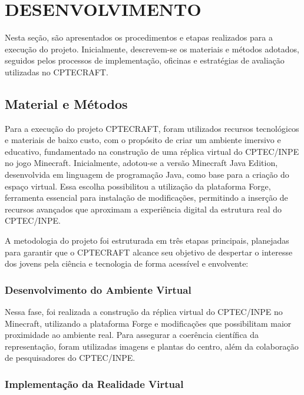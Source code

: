
\chapter{DESENVOLVIMENTO}

Nesta seção, são apresentados os procedimentos e etapas realizados para a execução do projeto. Inicialmente, descrevem-se os materiais e métodos adotados, seguidos pelos processos de implementação, oficinas e estratégias de avaliação utilizadas no CPTECRAFT.

\section{Material e Métodos}

Para a execução do projeto CPTECRAFT, foram utilizados recursos tecnológicos e materiais de baixo custo, com o propósito de criar um ambiente imersivo e educativo, fundamentado na construção de uma réplica virtual do CPTEC/INPE no jogo Minecraft. Inicialmente, adotou-se a versão Minecraft Java Edition, desenvolvida em linguagem de programação Java, como base para a criação do espaço virtual. Essa escolha possibilitou a utilização da plataforma Forge, ferramenta essencial para instalação de modificações, permitindo a inserção de recursos avançados que aproximam a experiência digital da estrutura real do CPTEC/INPE.

A metodologia do projeto foi estruturada em três etapas principais, planejadas para garantir que o CPTECRAFT alcance seu objetivo de despertar o interesse dos jovens pela ciência e tecnologia de forma acessível e envolvente:

\subsection{Desenvolvimento do Ambiente Virtual}

Nessa fase, foi realizada a construção da réplica virtual do CPTEC/INPE no Minecraft, utilizando a plataforma Forge e modificações que possibilitam maior proximidade ao ambiente real. Para assegurar a coerência científica da representação, foram utilizadas imagens e plantas do centro, além da colaboração de pesquisadores do CPTEC/INPE.

\subsection{Implementação da Realidade Virtual}

